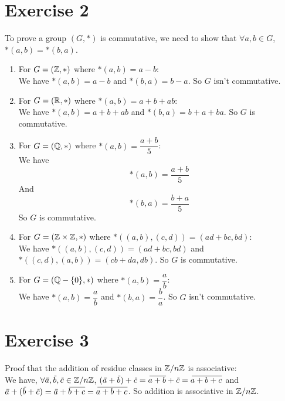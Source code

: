 \documentclass[12pt]{article}
\begin{document}
    \section*{Exercise 2}
    To prove a group $(G, \ast)$ is commutative,
    we need to show that $ \forall a, b \in G$, $\ast(a, b) = \ast(b, a)$.
    \begin{enumerate}[label=\textbf{\alph*.}]
        \item
            For $G = (\mathbb{Z}, \ast)$ where $\ast(a, b) = a - b$: \\
            We have $\ast(a, b) = a - b$ and $\ast(b, a) = b - a$.
            So $G$ isn't commutative.
        \item
            For $G = (\mathbb{R}, \ast)$ where $\ast(a, b) = a + b + ab$: \\
            We have $\ast(a, b) = a + b + ab$ and $\ast(b, a) = b + a + ba$.
            So $G$ is commutative.
        \item
            For $G = (\mathbb{Q}, \ast)$ where $\ast(a, b) = \dfrac{a+b}{5}$: \\
            We have \[\ast(a, b) = \dfrac{a + b}{5}\]
            And \[\ast(b, a) = \dfrac{b + a}{5}\]
            So $G$ is commutative.
        \item
            For $G = (\mathbb{Z} \times \mathbb{Z}, \ast)$
            where $\ast((a, b), (c, d)) = (ad + bc, bd)$: \\
            We have $\ast((a, b), (c, d)) = (ad + bc, bd)$
            and $\ast((c, d), (a, b)) = (cb + da, db)$.
            So $G$ is commutative.
        \item
            For $G = (\mathbb{Q} - \{0\}, \ast)$ where $\ast(a, b) = \dfrac{a}{b}$: \\
            We have $\ast(a, b) = \dfrac{a}{b}$ and $\ast(b, a) = \dfrac{b}{a}$.
            So $G$ isn't commutative. 
    \end{enumerate}


    \section*{Exercise 3}
    Proof that the addition of residue classes in $\mathbb{Z}/n\mathbb{Z}$ is associative: \\
    We have, $\forall \,\overline{\!{a}}, \,\overline{\!{b}}, \,\overline{\!{c}} \in \mathbb{Z}/n\mathbb{Z}$,
    $(\,\overline{\!{a}} + \,\overline{\!{b}}) + \,\overline{\!{c}}
    = \,\overline{\!{a + b}} + \,\overline{\!{c}}
    = \,\overline{\!{a + b + c}}$
    and $\,\overline{\!{a}} + (\,\overline{\!{b}} + \,\overline{\!{c}})
    = \,\overline{\!{a}} + \,\overline{\!{b + c}} 
    = \,\overline{\!{a + b + c}}$.
    So addition is associative in $\mathbb{Z}/n\mathbb{Z}$.
\end{document}
